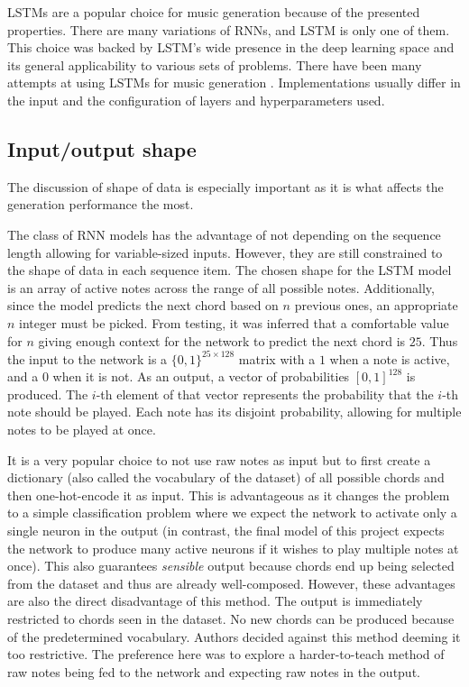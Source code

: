 \documentclass[a4paper, 11pt, twoside]{report}
\theoremstyle{definition}
\begin{document}
LSTMs are a popular choice for music generation because of the presented properties. There are many variations of RNNs, and LSTM is only one of them. This choice was backed by LSTM's wide presence in the deep learning space and its general applicability to various sets of problems. There have been many attempts at using LSTMs for music generation \cite{lstm_arxiv}. Implementations usually differ in the input and the configuration of layers and hyperparameters used. \par

\subsection{Input/output shape}

\newcommand{\lstmseqlen}{25}

The discussion of shape of data is especially important as it is what affects the generation performance the most. \par
The class of RNN models has the advantage of not depending on the sequence length allowing for variable-sized inputs. However, they are still constrained to the shape of data in each sequence item. The chosen shape for the LSTM model is an array of active notes across the range of all possible notes. Additionally, since the model predicts the next chord based on $n$ previous ones, an appropriate $n$ integer must be picked. From testing, it was inferred that a comfortable value for $n$ giving enough context for the network to predict the next chord is $\lstmseqlen$. Thus the input to the network is a $\{0, 1\}^{\lstmseqlen \times 128}$ matrix with a $1$ when a note is active, and a $0$ when it is not. As an output, a vector of probabilities $[0, 1]^{128}$ is produced. The $i$-th element of that vector represents the probability that the $i$-th note should be played. Each note has its disjoint probability, allowing for multiple notes to be played at once. \par
It is a very popular choice to not use raw notes as input but to first create a dictionary (also called the vocabulary of the dataset) of all possible chords and then one-hot-encode it as input. This is advantageous as it changes the problem to a simple classification problem where we expect the network to activate only a single neuron in the output (in contrast, the final model of this project expects the network to produce many active neurons if it wishes to play multiple notes at once). This also guarantees \textit{sensible} output because chords end up being selected from the dataset and thus are already well-composed. However, these advantages are also the direct disadvantage of this method. The output is immediately restricted to chords seen in the dataset. No new chords can be produced because of the predetermined vocabulary. Authors decided against this method deeming it too restrictive. The preference here was to explore a harder-to-teach method of raw notes being fed to the network and expecting raw notes in the output. \par
\end{document}
